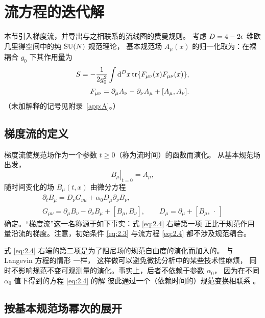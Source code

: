 \section{流方程的迭代解}\label{sec:iterative}

本节引入梯度流，并导出与之相联系的流线图的费曼规则。
考虑 $D=4-2\epsilon$ 维欧几里得空间中的纯 $\mathrm{SU}(N)$ 规范理论，
基本规范场 $A_{\mu}(x)$ 的归一化取为：在裸耦合 $g_0$ 下其作用量为
\begin{align}
  S=-\frac{1}{2g_0^2}\int\mathrm{d}^Dx\,\mathrm{tr}\{F_{\mu\nu}(x)F_{\mu\nu}(x)\},
  \label{eq:2.1}\\[2pt]
  F_{\mu\nu}=\partial_{\mu}A_{\nu}-\partial_{\nu}A_{\mu}+[A_{\mu},A_{\nu}].
  \label{eq:2.2}
\end{align}
（未加解释的记号见附录~\ref{app:A}。）

\subsection{梯度流的定义}\label{ssec:defflow}

梯度流使规范场作为一个参数 $t\geq0$（称为流时间）的函数而演化。
从基本规范场出发，
\begin{equation}
  \left.B_{\mu}\right|_{t=0}=A_{\mu},
  \label{eq:2.3}
\end{equation}
随时间变化的场 $B_{\mu}(t,x)$ 由微分方程
\begin{align}
  \partial_tB_{\mu}=D_{\nu}G_{\nu\mu}+\alpha_0D_{\mu}\partial_{\nu}B_{\nu},
  \label{eq:2.4}\\[2pt]
  G_{\mu\nu}=\partial_{\mu}B_{\nu}-\partial_{\nu}B_{\mu}+[B_{\mu},B_{\nu}],
  \qquad
  D_{\mu}=\partial_{\mu}+[B_{\mu},\,\cdot\;]
  \label{eq:2.5}
\end{align}
确定。``梯度流''这一名称源于如下事实：式 \eqref{eq:2.4} 右端第一项
正比于规范作用量沿流的梯度。注意，初始条件 \eqref{eq:2.3}
与流方程 \eqref{eq:2.4} 都不涉及规范耦合。

式 \eqref{eq:2.4} 右端的第二项是为了阻尼场的规范自由度的演化而加入的。
与 Langevin 方程的情形 \cite{ZinnZwanziger} 一样，
这样做可以避免微扰分析中的某些技术性麻烦，
同时不影响规范不变可观测量的演化。事实上，后者不依赖于参数 $\alpha_0$，
因为在不同 $\alpha_0$ 值下得到的方程 \eqref{eq:2.4} 的解
彼此通过一个（依赖时间的）规范变换相联系 \cite{WilsonFlow}。

\subsection{按基本规范场幂次的展开}

